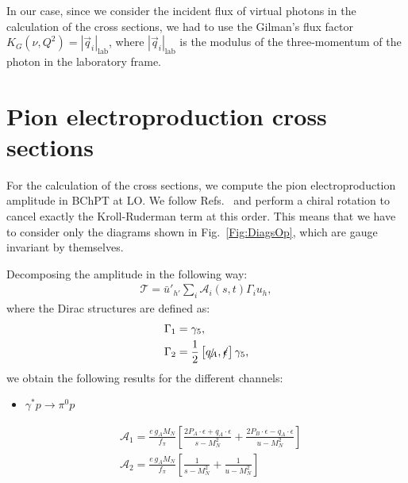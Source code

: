 \documentclass[twocolumn,prc,showpacs,nofootinbib,preprintnumbers,amsmath,amssymb,superscriptaddress]{revtex4-1}
\begin{document}
In our case, since we consider the incident flux of virtual photons in the calculation of the cross sections, we had to use the Gilman's flux factor $K_G(\nu,Q^2)=|\vec{q}_i|_\mathrm{lab}$, where  $|\vec{q}_i|_\mathrm{lab}$ is the modulus of the three-momentum of the photon in the laboratory frame.




\section{Pion electroproduction cross sections}\label{App:CrossSections}

For the calculation of the cross sections, we compute the pion electroproduction amplitude in BChPT at LO.
We follow Refs.~\cite{Holstein:2005db,Lensky:2009uv} and perform a chiral rotation to cancel exactly the Kroll-Ruderman term at this order.
This means that we have to consider only the diagrams shown in Fig.~\ref{Fig:DiagsOp}, which are gauge invariant by themselves.

Decomposing the amplitude in the following way:
\begin{align}\label{Eq:T-decomposition}
\mathcal{T}= \bar{u}'_{h'} \sum_{i}  \mathcal{A}_i (s,t) \Gamma_i u_h,
\end{align}
where the Dirac structures are defined as:
\begin{align}\label{Eq:DefGammas}
  \Gamma_1&= \gamma_5, \\
  \Gamma_2&= \frac{1}{2}\left[\slashed{q_A},\slashed{\epsilon}\right]\gamma_5,  
\end{align}
we obtain the following results for the different channels:
\begin{itemize}
 \item $\gamma^* p \to \pi^0 p$
\end{itemize}
\begin{align}
  &\mathcal{A}_1= \frac{e\, g_A M_N}{f_\pi}\left[\frac{2 P_A\cdot \epsilon + q_A\cdot \epsilon}{s-M_N^2} + \frac{2 P_B\cdot \epsilon - q_A\cdot \epsilon}{u-M_N^2}\right] \\
   &\mathcal{A}_2=\frac{e\, g_A M_N}{f_\pi}\left[\frac{1}{s-M_N^2} + \frac{1}{u-M_N^2}\right]
\end{align}
\end{document}
